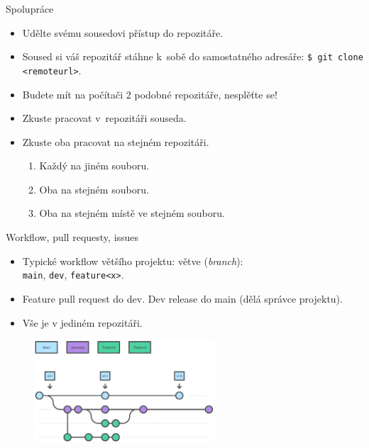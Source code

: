 \documentclass[
]{beamer}
\begin{document}
\begin{frame}{Spolupráce}
\begin{itemize}
	\item Udělte svému sousedovi přístup do repozitáře.
	\item Soused si váš repozitář stáhne k sobě do samostatného adresáře: \texttt{\$ git clone <remoteurl>}.
	\item Budete mít na počítači 2 podobné repozitáře, nesplěťte se!
	\item Zkuste pracovat v repozitáři souseda.
	\item Zkuste oba pracovat na stejném repozitáři.
	\begin{enumerate}
		\item Každý na jiném souboru.
		\item Oba na stejném souboru.
		\item Oba na stejném místě ve stejném souboru.
	\end{enumerate}
\end{itemize}
\end{frame}


\begin{frame}{Workflow, pull requesty, issues}
\begin{itemize}
	\item Typické workflow většího projektu: větve (\textit{branch}): \\
	\texttt{main}, \texttt{dev}, \texttt{feature<x>}.
	\item Feature pull request do dev. Dev release do main (dělá správce projektu).
	\item Vše je v jediném repozitáři.
\end{itemize}

\begin{figure}
	\centering
	\includegraphics[width=0.6\textwidth]{images/features.pdf}
\end{figure}
\end{frame}
\end{document}
